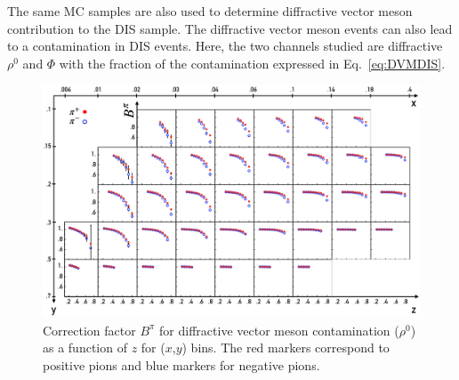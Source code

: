 The same MC samples are also used to determine diffractive vector meson contribution to the DIS sample. The diffractive vector meson events can also lead to a contamination in DIS events. Here, the two channels studied are diffractive $\rho^0$ and $\Phi$ with the fraction of the contamination expressed in Eq.~\ref{eq:DVMDIS}.

\begin{figure}
  \centering
	\includegraphics[scale=0.5]{./gfx/DVMpi.png}
	\caption{Correction factor $B^{\pi}$ for diffractive vector meson contamination ($\rho^0$) as a function of $z$ for ($x$,$y$) bins. The red markers correspond to positive pions and blue markers for negative pions.}
	\label{DVMpi}
\end{figure}

